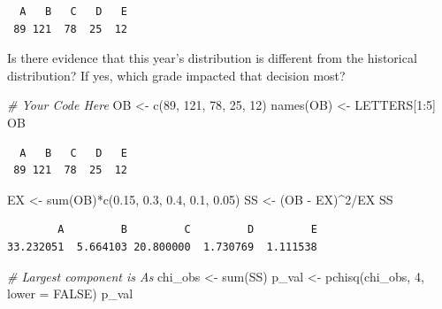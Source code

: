 \documentclass[
]{article}
\newenvironment{Shaded}{\begin{snugshade}}{\end{snugshade}}
\newcommand{\AttributeTok}[1]{\textcolor[rgb]{0.77,0.63,0.00}{#1}}
\newcommand{\CommentTok}[1]{\textcolor[rgb]{0.56,0.35,0.01}{\textit{#1}}}
\newcommand{\ConstantTok}[1]{\textcolor[rgb]{0.00,0.00,0.00}{#1}}
\newcommand{\DecValTok}[1]{\textcolor[rgb]{0.00,0.00,0.81}{#1}}
\newcommand{\FloatTok}[1]{\textcolor[rgb]{0.00,0.00,0.81}{#1}}
\newcommand{\FunctionTok}[1]{\textcolor[rgb]{0.00,0.00,0.00}{#1}}
\newcommand{\NormalTok}[1]{#1}
\newcommand{\OtherTok}[1]{\textcolor[rgb]{0.56,0.35,0.01}{#1}}
\newcommand{\SpecialCharTok}[1]{\textcolor[rgb]{0.00,0.00,0.00}{#1}}
\begin{document}
\begin{verbatim}
  A   B   C   D   E 
 89 121  78  25  12 
\end{verbatim}

Is there evidence that this year's distribution is different from the historical distribution? If yes, which grade impacted that decision most?

\begin{Shaded}
\begin{Highlighting}[]
\CommentTok{\# Your Code Here}
\NormalTok{OB }\OtherTok{\textless{}{-}} \FunctionTok{c}\NormalTok{(}\DecValTok{89}\NormalTok{, }\DecValTok{121}\NormalTok{, }\DecValTok{78}\NormalTok{, }\DecValTok{25}\NormalTok{, }\DecValTok{12}\NormalTok{)}
\FunctionTok{names}\NormalTok{(OB) }\OtherTok{\textless{}{-}}\NormalTok{ LETTERS[}\DecValTok{1}\SpecialCharTok{:}\DecValTok{5}\NormalTok{]}
\NormalTok{OB}
\end{Highlighting}
\end{Shaded}

\begin{verbatim}
  A   B   C   D   E 
 89 121  78  25  12 
\end{verbatim}

\begin{Shaded}
\begin{Highlighting}[]
\NormalTok{EX }\OtherTok{\textless{}{-}} \FunctionTok{sum}\NormalTok{(OB)}\SpecialCharTok{*}\FunctionTok{c}\NormalTok{(}\FloatTok{0.15}\NormalTok{, }\FloatTok{0.3}\NormalTok{, }\FloatTok{0.4}\NormalTok{, }\FloatTok{0.1}\NormalTok{, }\FloatTok{0.05}\NormalTok{)}
\NormalTok{SS }\OtherTok{\textless{}{-}}\NormalTok{ (OB }\SpecialCharTok{{-}}\NormalTok{ EX)}\SpecialCharTok{\^{}}\DecValTok{2}\SpecialCharTok{/}\NormalTok{EX}
\NormalTok{SS}
\end{Highlighting}
\end{Shaded}

\begin{verbatim}
        A         B         C         D         E 
33.232051  5.664103 20.800000  1.730769  1.111538 
\end{verbatim}

\begin{Shaded}
\begin{Highlighting}[]
\CommentTok{\# Largest component is A\textquotesingle{}s}
\NormalTok{chi\_obs }\OtherTok{\textless{}{-}} \FunctionTok{sum}\NormalTok{(SS)}
\NormalTok{p\_val }\OtherTok{\textless{}{-}} \FunctionTok{pchisq}\NormalTok{(chi\_obs, }\DecValTok{4}\NormalTok{, }\AttributeTok{lower =} \ConstantTok{FALSE}\NormalTok{)}
\NormalTok{p\_val}
\end{Highlighting}
\end{Shaded}
\end{document}
